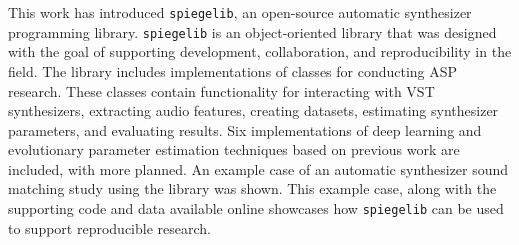 This work has introduced \texttt{spiegelib}, an open-source automatic synthesizer programming library. \texttt{spiegelib} is an object-oriented library that was designed with the goal of supporting development, collaboration, and reproducibility in the field. The library includes implementations of classes for conducting ASP research. These classes contain functionality for interacting with VST synthesizers, extracting audio features, creating datasets, estimating synthesizer parameters, and evaluating results. Six implementations of deep learning and evolutionary parameter estimation techniques based on previous work are included, with more planned. An example case of an automatic synthesizer sound matching study using the library was shown. This example case, along with the supporting code and data available online showcases how \texttt{spiegelib} can be used to support reproducible research.
